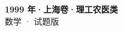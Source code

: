 \documentclass[zihao=-4, a4paper]{ctexart}
\begin{document}
\begin{center}
  {\Large\bfseries 1999 年·上海卷·理工农医类}\\[4pt]
  {\large 数学 · 试题版}
\end{center}
\medskip
{}

\end{document}
